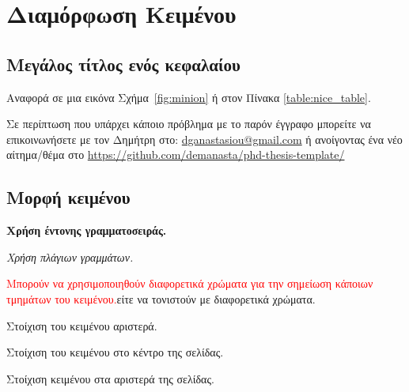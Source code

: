 
\chapter{Διαμόρφωση Κειμένου}

\ifpdf
    \graphicspath{{Chapter2/Figs/Raster/}{Chapter2/Figs/PDF/}{Chapter2/Figs/}}
\else
    \graphicspath{{Chapter2/Figs/Vector/}{Chapter2/Figs/}}
\fi


\section[Συμπτηγμένος τίτλος]{Μεγάλος τίτλος ενός κεφαλαίου}

Αναφορά σε μια εικόνα Σχήμα~\ref{fig:minion} ή στον Πίνακα \ref{table:nice_table}.


Σε περίπτωση που υπάρχει κάποιο πρόβλημα με το παρόν έγγραφο μπορείτε να επικοινωνήσετε με τον Δημήτρη στο: \href{mailto:dganastasiou@gmail.com}{dganastasiou@gmail.com} ή ανοίγοντας ένα νέο αίτημα/θέμα στο \url{https://github.com/demanasta/phd-thesis-template/}

\section{Μορφή κειμένου}
\textbf{Χρήση έντονης γραμματοσειράς.}

\textit{Χρήση πλάγιων γραμμάτων.}

\textcolor{red}{Μπορούν να χρησιμοποιηθούν διαφορετικά χρώματα για την σημείωση κάποιων τμημάτων του κειμένου.}\colorbox{BurntOrange}{είτε να τονιστούν με διαφορετικά χρώματα.}

\begin{flushleft}
Στοίχιση του κειμένου αριστερά.
\end{flushleft}

\begin{center}
Στοίχιση του κειμένου στο κέντρο της σελίδας.
\end{center}

\begin{flushright}
Στοίχιση κειμένου στα αριστερά της σελίδας.
\end{flushright}


